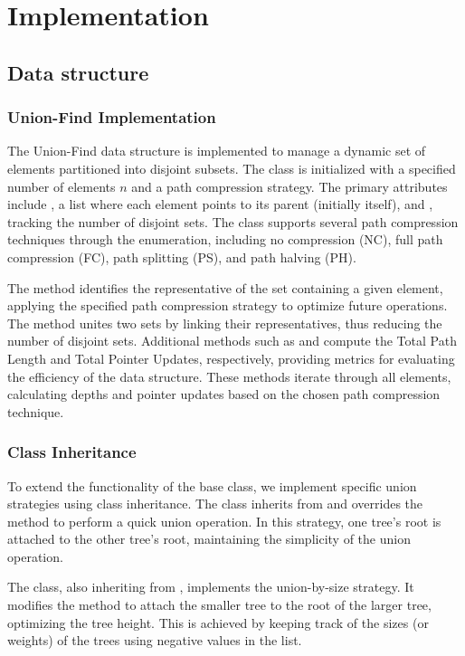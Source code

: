 \documentclass[10pt,a4paper,hidelinks]{article}
\begin{document}
\section{Implementation}
\subsection{Data structure}
\subsubsection{Union-Find Implementation}
The Union-Find data structure is implemented to manage a dynamic set of elements partitioned into disjoint subsets. The class  is initialized with a specified number of elements $n$ and a path compression strategy. The primary attributes include , a list where each element points to its parent (initially itself), and , tracking the number of disjoint sets. The class supports several path compression techniques through the  enumeration, including no compression (NC), full path compression (FC), path splitting (PS), and path halving (PH).

The  method identifies the representative of the set containing a given element, applying the specified path compression strategy to optimize future operations. The  method unites two sets by linking their representatives, thus reducing the number of disjoint sets. Additional methods such as  and  compute the Total Path Length and Total Pointer Updates, respectively, providing metrics for evaluating the efficiency of the data structure. These methods iterate through all elements, calculating depths and pointer updates based on the chosen path compression technique.

\subsubsection{Class Inheritance}
To extend the functionality of the base  class, we implement specific union strategies using class inheritance. The  class inherits from  and overrides the  method to perform a quick union operation. In this strategy, one tree's root is attached to the other tree's root, maintaining the simplicity of the union operation.

The  class, also inheriting from , implements the union-by-size strategy. It modifies the  method to attach the smaller tree to the root of the larger tree, optimizing the tree height. This is achieved by keeping track of the sizes (or weights) of the trees using negative values in the  list.
\end{document}
